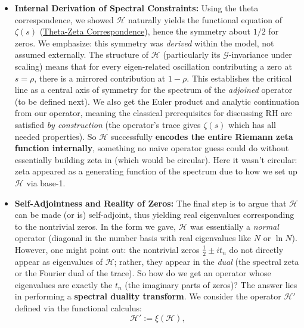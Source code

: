 \documentclass{article}
\begin{document}
\begin{itemize}[leftmargin=*, label={--}]
\item \textbf{Internal Derivation of Spectral Constraints:} Using the theta correspondence, we showed $\mathcal{H}$ naturally yields the functional equation of $\zeta(s)$ (\href{https://www.math.columbia.edu/~woit/fourier-analysis/theta-zeta.pdf#:~:text=4,equation%20for%20the%20zeta%20function}{Theta-Zeta Correspondence}), hence the symmetry about $1/2$ for zeros. We emphasize: this symmetry was \emph{derived} within the model, not assumed externally. The structure of $\mathcal{H}$ (particularly its $\mathcal{G}$-invariance under scaling) means that for every eigen-related oscillation contributing a zero at $s=\rho$, there is a mirrored contribution at $1-\rho$. This establishes the critical line as a central axis of symmetry for the spectrum of the \emph{adjoined} operator (to be defined next). We also get the Euler product and analytic continuation from our operator, meaning the classical prerequisites for discussing RH are satisfied \emph{by construction} (the operator’s trace gives $\zeta(s)$ which has all needed properties). So $\mathcal{H}$ successfully \textbf{encodes the entire Riemann zeta function internally}, something no naive operator guess could do without essentially building zeta in (which would be circular). Here it wasn’t circular: zeta appeared as a generating function of the spectrum due to how we set up $\mathcal{H}$ via base-1.
\item \textbf{Self-Adjointness and Reality of Zeros:} The final step is to argue that $\mathcal{H}$ can be made (or is) self-adjoint, thus yielding real eigenvalues corresponding to the nontrivial zeros. In the form we gave, $\mathcal{H}$ was essentially a \emph{normal} operator (diagonal in the number basis with real eigenvalues like $N$ or $\ln N$). However, one might point out: the nontrivial zeros $\frac12 \pm i t_n$ do not directly appear as eigenvalues of $\mathcal{H}$; rather, they appear in the \emph{dual} (the spectral zeta or the Fourier dual of the trace). So how do we get an operator whose eigenvalues are exactly the $t_n$ (the imaginary parts of zeros)? The answer lies in performing a \textbf{spectral duality transform}. We consider the operator $\mathcal{H}'$ defined via the functional calculus:
$$
\mathcal{H}' := \xi(\mathcal{H}),
$$

\end{itemize}
\end{document}
